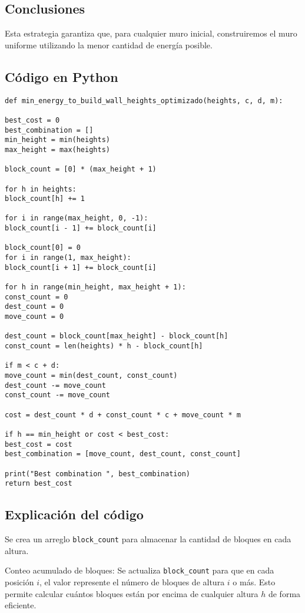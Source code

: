 \documentclass[a4paper,12pt]{article}
\begin{document}
\subsection{Conclusiones}

Esta estrategia garantiza que, para cualquier muro inicial, construiremos el muro uniforme utilizando la menor cantidad de energía posible.

\subsection{Código en Python}
\begin{verbatim}
def min_energy_to_build_wall_heights_optimizado(heights, c, d, m):

best_cost = 0
best_combination = []
min_height = min(heights)
max_height = max(heights)

block_count = [0] * (max_height + 1)

for h in heights:
block_count[h] += 1

for i in range(max_height, 0, -1):
block_count[i - 1] += block_count[i]

block_count[0] = 0
for i in range(1, max_height):
block_count[i + 1] += block_count[i]

for h in range(min_height, max_height + 1):
const_count = 0
dest_count = 0
move_count = 0

dest_count = block_count[max_height] - block_count[h]
const_count = len(heights) * h - block_count[h]

if m < c + d:
move_count = min(dest_count, const_count)
dest_count -= move_count
const_count -= move_count

cost = dest_count * d + const_count * c + move_count * m

if h == min_height or cost < best_cost:
best_cost = cost
best_combination = [move_count, dest_count, const_count]

print("Best combination ", best_combination)
return best_cost
\end{verbatim}

\subsection{Explicación del código}
	
Se crea un arreglo \texttt{block\_count} para almacenar la cantidad de bloques en cada altura.

Conteo acumulado de bloques: Se actualiza \texttt{block\_count} para que en cada posición \(i\), el valor represente el número de bloques de altura \(i\) o más. Esto permite calcular cuántos bloques están por encima de cualquier altura \(h\) de forma eficiente.
\end{document}
